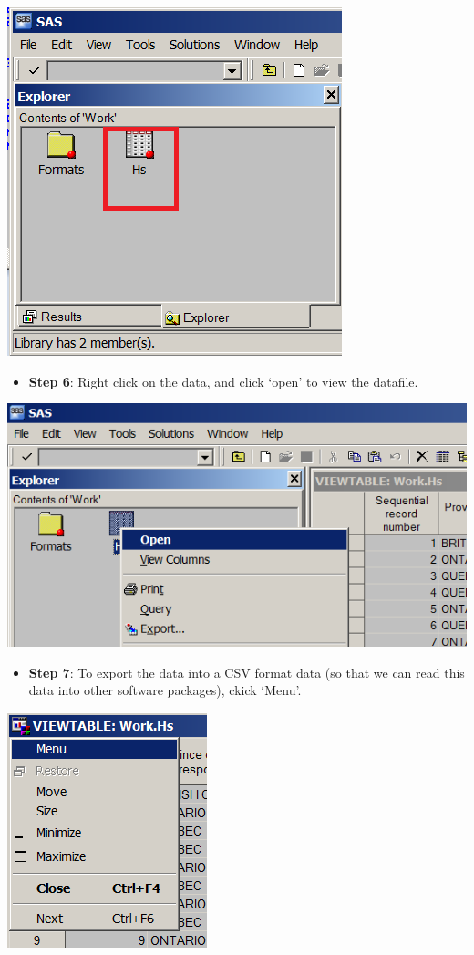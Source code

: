 \documentclass[
]{book}
\providecommand{\tightlist}{%
  \setlength{\itemsep}{0pt}\setlength{\parskip}{0pt}}
\begin{document}
\includegraphics[width=0.65\linewidth]{images/abacus18}

\begin{itemize}
\tightlist
\item
  \textbf{Step 6}: Right click on the data, and click `open' to view the datafile.
\end{itemize}

\includegraphics[width=0.65\linewidth]{images/abacus19}

\begin{itemize}
\tightlist
\item
  \textbf{Step 7}: To export the data into a CSV format data (so that we can read this data into other software packages), ckick `Menu'.
\end{itemize}

\includegraphics[width=0.65\linewidth]{images/abacus20}
\end{document}
